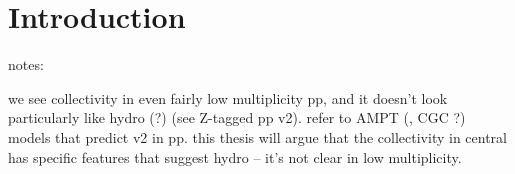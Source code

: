 \chapter{Introduction}
\label{ch:intro}


 notes:

 we see collectivity in even fairly low multiplicity pp, and it doesn't look particularly like hydro (?) (see Z-tagged pp v2). refer to AMPT (, CGC ?) models that predict v2 in pp. this thesis will argue that the collectivity in central \pPb has specific features that suggest hydro -- it's not clear in low multiplicity.

